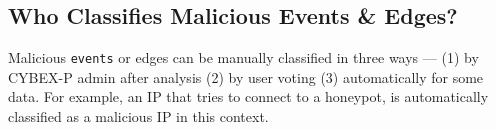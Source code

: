 \subsection{Who Classifies Malicious Events \& Edges?}

Malicious \texttt{events} or edges can be manually classified in three ways --- (1) by CYBEX-P admin after analysis (2) by user voting (3) automatically for some data. For example, an IP that tries to connect to a honeypot, is automatically classified as a malicious IP in this context.





